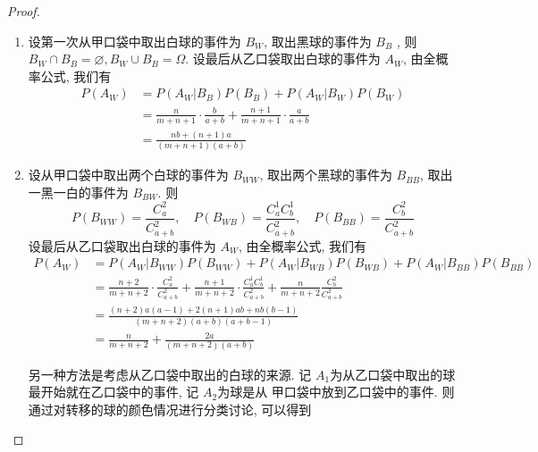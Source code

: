 \documentclass[../main.tex]{subfiles}
\begin{document}
\begin{proof}
    \begin{enumerate}
        \item 设第一次从甲口袋中取出白球的事件为 \(  B_{W}  \), 取出黑球的事件为 \(  B_{B}  \)  , 则 \(  B_{W}\cap B_{B}= \varnothing, B_{W}\cup B_{B}=  \Omega   \). 设最后从乙口袋取出白球的事件为 \(  A_{W}  \), 由全概率公式, 我们有 \[
        \begin{aligned}
        P\left( A_{W} \right)&= P\left( A_{W}|B_{B} \right)P\left( B_{B} \right)+ P\left( A_{W}|B_{W} \right)P\left( B_{W} \right)\\ 
         &= \frac{n }{m+ n+ 1 }\cdot \frac{b }{a+ b }        + \frac{ n+ 1}{m+ n+ 1 } \cdot \frac{a }{a+ b } \\ 
          &= \frac{nb+ \left( n+ 1 \right)a  }{ \left( m+ n+ 1 \right)\left( a+ b \right)  } 
        \end{aligned}
        \]  
        \item 设从甲口袋中取出两个白球的事件为 \(  B_{WW}  \), 取出两个黑球的事件为 \(  B_{BB}  \), 取出一黑一白的事件为 \(  B_{BW}  \). 则 \[
        P\left( B_{WW} \right)= \frac{C_{a}^{2} }{C_{a+ b}^{2} },\quad P\left( B_{WB} \right)= \frac{C_{a}^{1}C_{b}^{1} }{C_{a+ b}^{2} }    ,\quad P\left( B_{BB} \right)= \frac{C_{b}^{2} }{C_{a+ b}^{2} }  
        \]   设最后从乙口袋取出白球的事件为 \(  A_{W}  \),  由全概率公式, 我们有 \[
        \begin{aligned}
        P\left( A_{W} \right)&= P\left( A_{W}|B_{WW} \right)P\left( B_{WW} \right)+ P\left( A_{W}|B_{WB} \right)P\left( B_{WB} \right)+ P\left( A_{W}|B_{BB} \right)P\left( B_{BB} \right)\\ 
         &=    \frac{n+ 2 }{m+ n+ 2 }\cdot \frac{C_{a}^{2} }{C_{a+ b}^{2} }+ \frac{n+ 1 }{m+ n+ 2 }\cdot \frac{C_{a}^{1}C_{b}^{1} }{C_{a+ b}^{2} }+ \frac{n }{m+ n+ 2 }\frac{C_{b}^{2} }{C_{a+ b}^{2} }\\ 
          &= \frac{\left( n+ 2 \right) a\left( a-1 \right)+ 2\left( n+ 1 \right)ab  + nb\left( b-1 \right)  }{\left( m+ n+ 2 \right)\left( a+ b \right)\left( a+ b-1 \right)    }            \\ 
           &= \frac{n }{m+ n+ 2 }+ \frac{2a }{\left( m+ n+ 2 \right)\left( a+ b \right)   }  
        \end{aligned}
        \]
        \begin{remark}
            另一种方法是考虑从乙口袋中取出的白球的来源. 记 \(  A_1  \)为从乙口袋中取出的球最开始就在乙口袋中的事件, 记 \(  A_2  \)为球是从  甲口袋中放到乙口袋中的事件. 则通过对转移的球的颜色情况进行分类讨论, 可以得到 \[
\]
\end{remark}
\end{enumerate}
\end{proof}
\end{document}

